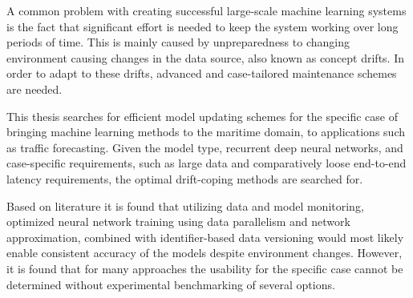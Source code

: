 
A common problem with creating successful large-scale machine learning systems is the fact that significant effort is needed to keep the system working over long periods of time. This is mainly caused by unpreparedness to changing environment causing changes in the data source, also known as concept drifts. In order to adapt to these drifts, advanced and case-tailored maintenance schemes are needed.

This thesis searches for efficient model updating schemes for the specific case of bringing machine learning methods to the maritime domain, to applications such as traffic forecasting. Given the model type, recurrent deep neural networks, and case-specific requirements, such as large data and comparatively loose end-to-end latency requirements, the optimal drift-coping methods are searched for.

Based on literature it is found that utilizing data and model monitoring, optimized neural network training using data parallelism and network approximation, combined with  identifier-based data versioning would most likely enable consistent accuracy of the models despite environment changes. However, it is found that for many approaches the usability for the specific case cannot be determined without experimental benchmarking of several options.  %

  
